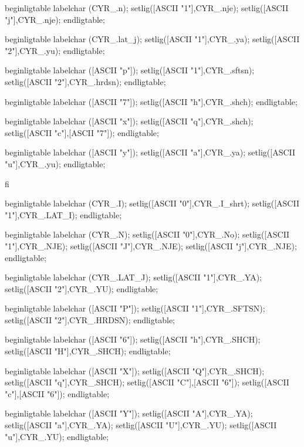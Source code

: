 {  beginligtable
    labelchar (CYR_.n);
      setlig([ASCII "1"],CYR_.nje); setlig([ASCII "j"],CYR_.nje);
  endligtable;

  beginligtable
    labelchar (CYR_.lat_j);
      setlig([ASCII "1"],CYR_.ya); setlig([ASCII "2"],CYR_.yu);
  endligtable;

  beginligtable
    labelchar ([ASCII "p"]);
      setlig([ASCII "1"],CYR_.sftsn); setlig([ASCII "2"],CYR_.hrdsn);
  endligtable;

  beginligtable
    labelchar ([ASCII "7"]);
      setlig([ASCII "h"],CYR_.shch);
  endligtable;

  beginligtable
    labelchar ([ASCII "x"]);
    setlig([ASCII "q"],CYR_.shch); setlig([ASCII "c"],[ASCII "7"]);
  endligtable;

  beginligtable
    labelchar ([ASCII "y"]);
    setlig([ASCII "a"],CYR_.ya); setlig([ASCII "u"],CYR_.yu);
  endligtable;

fi^^M%

beginligtable
  labelchar (CYR_.I);
    setlig([ASCII "0"],CYR_.I_shrt); setlig([ASCII "1"],CYR_.LAT_I);
endligtable;

beginligtable
  labelchar (CYR_.N);
    setlig([ASCII "0"],CYR_.No); setlig([ASCII "1"],CYR_.NJE);
    setlig([ASCII "J"],CYR_.NJE); setlig([ASCII "j"],CYR_.NJE);
endligtable;

beginligtable
  labelchar (CYR_.LAT_J);
    setlig([ASCII "1"],CYR_.YA); setlig([ASCII "2"],CYR_.YU);
endligtable;

beginligtable
  labelchar ([ASCII "P"]);
    setlig([ASCII "1"],CYR_.SFTSN); setlig([ASCII "2"],CYR_.HRDSN);
endligtable;

beginligtable
  labelchar ([ASCII "6"]);
    setlig([ASCII "h"],CYR_.SHCH); setlig([ASCII "H"],CYR_.SHCH);
endligtable;

beginligtable
  labelchar ([ASCII "X"]);
    setlig([ASCII "Q"],CYR_.SHCH); setlig([ASCII "q"],CYR_.SHCH);
    setlig([ASCII "C"],[ASCII "6"]);     setlig([ASCII "c"],[ASCII "6"]);
endligtable;

beginligtable
  labelchar ([ASCII "Y"]);
    setlig([ASCII "A"],CYR_.YA); setlig([ASCII "a"],CYR_.YA);
    setlig([ASCII "U"],CYR_.YU); setlig([ASCII "u"],CYR_.YU);
endligtable;

}
\endgroup

\fi %


